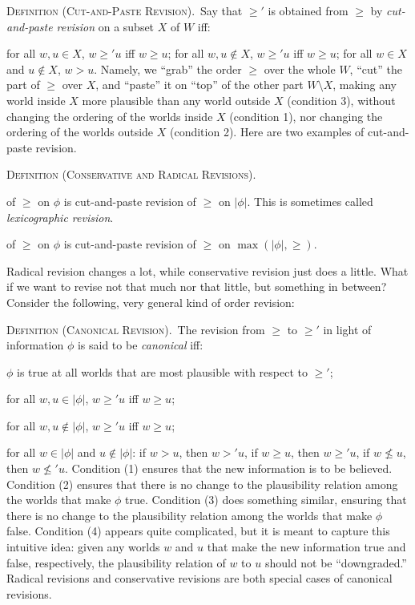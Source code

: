 	\xm \textsc{Definition (Cut-and-Paste Revision).}\, Say that $\ge'$ is obtained from $\ge$ by {\em cut-and-paste revision} on a subset $X$ of $W$ iff: \op

		\im[(1)] for all $w, u \in X$, $w \ge' u$ iff $w \ge u$;
		\im[(2)] for all $w, u \not\in X$, $w \ge' u$ iff $w \ge u$;
		\im[(3)] for all $w \in X$ and $u \not\in X$, $w > u$.
	\ed 
\ed Namely, we ``grab'' the order $\ge$ over the whole $W$, ``cut'' the part of $\ge$ over $X$, and ``paste'' it on ``top'' of the other part $W \setminus X$, making any world inside $X$ more plausible than any world outside $X$ (condition 3), without changing the ordering of the worlds inside $X$ (condition 1), nor changing the ordering of the worlds outside $X$ (condition 2). Here are two examples of cut-and-paste revision. \op

	\xm \textsc{Definition (Conservative and Radical Revisions).}\,

	 of $\ge$ on $\phi$ is cut-and-paste revision of $\ge$ on $|\phi|$. This is sometimes called {\em lexicographic revision}.

	 of $\ge$ on $\phi$ is cut-and-paste revision of $\ge$ on $\max(|\phi|, \ge)$.

\ed Radical revision changes a lot, while conservative revision just does a little. What if we want to revise not that much nor that little, but something in between? Consider the following, very general kind of order revision:\op

	\xm \textsc{Definition (Canonical Revision).}\, The revision from $\ge$ to $\ge'$ in light of information $\phi$ is said to be {\em canonical} iff: \op

	\im[(1)] $\phi$ is true at all worlds that are most plausible with respect to $\ge'$;

	\im[(2)] for all $w, u \in |\phi|$, $w \ge' u$ iff $w \ge u$;

	\im[(3)] for all $w, u \not\in |\phi|$, $w \ge' u$ iff $w \ge u$;

	\im[(4)] for all $w \in |\phi|$ and $u \not\in |\phi|$:
		\op
		\im if $w > u$, then $w >' u$,
		\im if $w \ge u$, then $w \ge' u$,
		\im if $w \not\le u$, then $w \not\le' u$.
		\ed
	\ed
\ed Condition (1) ensures that the new information is to be believed. Condition (2) ensures that there is no change to the plausibility relation among the worlds that make $\phi$ true. Condition (3) does something similar, ensuring that there is no change to the plausibility relation among the worlds that make $\phi$ false. Condition (4) appears quite complicated, but it is meant to capture this intuitive idea: given any worlds $w$ and $u$ that make the new information true and false, respectively, the plausibility relation of $w$ to $u$ should not be ``downgraded.'' Radical revisions and conservative revisions are both special cases of canonical revisions. 

